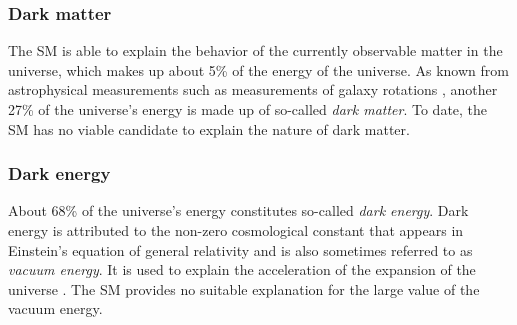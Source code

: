 

\subsubsection{Dark matter}
The SM is able to explain the behavior of the currently observable matter in the universe, which makes up about 5\% of the energy of the universe. 
As known from astrophysical measurements such as measurements of galaxy rotations , another 27\% of the universe's energy is made up of so-called \emph{dark matter}. To date, the SM has no viable candidate to explain the nature of dark matter. 


\subsubsection{Dark energy}
About 68\% of the universe's energy constitutes so-called \emph{dark energy}. Dark energy is attributed to the non-zero cosmological constant that appears in Einstein's equation of general relativity and is also sometimes referred to as \emph{vacuum energy}. It is used to explain the acceleration of the expansion of the universe . The SM provides no suitable explanation for the large value of the vacuum energy. 


